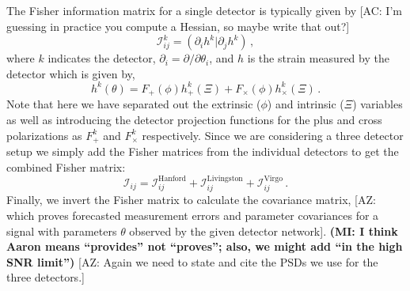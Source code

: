\documentclass[twocolumn]{aastex631}
\newcommand{\AZ}[1]{{\color{Burnt}[AZ: #1]}}
\newcommand{\mi}[1]{\textbf{\color{teal}(MI: #1)}}
\newcommand{\amc}[1]{{\color{red}[AC: #1]}}
\begin{document}
The Fisher information matrix for a single detector is typically given by \amc{I'm guessing in practice you compute a Hessian, so maybe write that out?}
\begin{equation}
    \label{eq:fisher}
    \mathcal{I}^{k}_{ij} = (\partial_i h^k | \partial_j h^k) \, ,
\end{equation}
where $k$ indicates the detector, $\partial_i = \partial/\partial \theta_i$, and $h$ is the strain measured by the detector which is given by,
\begin{equation}
    h^k(\theta) = F_+(\phi) h^k_{+}(\Xi) + F_\times(\phi) h^k_{\times}(\Xi) \, .
\end{equation}
Note that here we have separated out the extrinsic ($\phi$) and intrinsic ($\Xi$) variables as well as introducing the detector projection functions for the plus and cross polarizations as $F^k_+$ and $F^k_\times$ respectively.
Since we are considering a three detector setup we simply add the Fisher matrices from the individual detectors to get the combined Fisher matrix:
\begin{equation}
    \mathcal{I}_{ij} =  \mathcal{I}^{\mathrm{Hanford}}_{ij} + \mathcal{I}^{\mathrm{Livingston}}_{ij} + \mathcal{I}^{\mathrm{Virgo}}_{ij}   \, .
\end{equation}
Finally, we invert the Fisher matrix to calculate the covariance matrix,
\AZ{which proves forecasted measurement errors and parameter covariances for a signal with parameters $\theta$ observed by the given detector network}.
\mi{I think Aaron means ``provides'' not ``proves''; also, we might add ``in the high SNR limit''}
\AZ{Again we need to state and cite the PSDs we use for the three detectors.}

\end{document}
